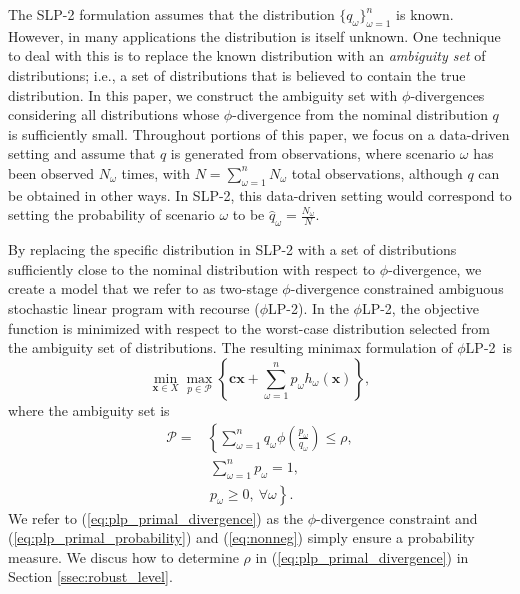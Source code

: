 \documentclass[ijoc,letterpaper]{informs3} %
\newcommand{\x}{\mathbf{x}}
\renewcommand{\c}{\mathbf{c}}
\newcommand{\plp}{$\phi$LP-2}
\begin{document}
The SLP-2 formulation assumes that the distribution $\{q_\omega\}_{\omega=1}^n$ is known.
However, in many applications the distribution is itself unknown.
One technique to deal with this is to replace the known distribution with an {\it ambiguity set} of distributions; i.e., a set of distributions that is believed to contain the true distribution.
In this paper, we construct the ambiguity set with $\phi$-divergences considering all distributions whose $\phi$-divergence from the nominal distribution $q$ is sufficiently small.
Throughout portions of this paper, we focus on a data-driven setting and assume that $q$ is generated from observations, where scenario $\omega$ has been observed $N_\omega$ times, with $N = \sum_{\omega=1}^n N_\omega$ total observations, although $q$ can be obtained in other ways.
In SLP-2, this data-driven setting would correspond to setting the probability of scenario $\omega$ to be $\hat{q}_\omega = \frac{N_\omega}{N}$.

By replacing the specific distribution in SLP-2 with a set of distributions sufficiently close to the nominal distribution with respect to $\phi$-divergence, we create a model that we refer to as two-stage $\phi$-divergence constrained ambiguous stochastic linear program with recourse (\plp).
In the \plp, the objective function is minimized with respect to the worst-case distribution selected from the ambiguity set of distributions.
The resulting minimax formulation of \plp\ is
\begin{equation}
	\min_{\x \in X} \max_{p \in \mathcal{P}} \left\{ \c\x + \sum_{\omega=1}^{n} p_\omega h_\omega(\x) \right\}, \label{eq:plp_primal}
\end{equation}
where the ambiguity set is
\begin{align}
	\mathcal{P} = & \left\{ \sum_{\omega = 1}^{n} q_\omega \phi\left(\frac{p_\omega}{q_\omega}\right) \leq \rho, \right. \label{eq:plp_primal_divergence} \\
	& \ \sum_{\omega=1}^{n} p_\omega = 1, \label{eq:plp_primal_probability} \\
	& \ \left. p_\omega \geq 0,\ \forall \omega \right\}. \label{eq:nonneg}
\end{align}
We refer to (\ref{eq:plp_primal_divergence}) as the $\phi$-divergence constraint and (\ref{eq:plp_primal_probability}) and (\ref{eq:nonneg}) simply ensure a probability measure.
We discus how to determine $\rho$ in (\ref{eq:plp_primal_divergence}) in Section \ref{ssec:robust_level}.
\end{document}
